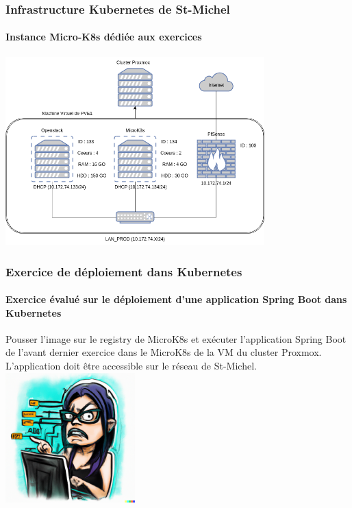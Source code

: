 \documentclass{beamer}
\begin{document}
    \begin{frame}
        \transdissolve
        \frametitle{Infrastructure Kubernetes de St-Michel}
        \framesubtitle{Instance Micro-K8s dédiée aux exercices}
        \bigbreak
        \centering
        \includegraphics[width=10cm]{image/infra.drawio}
    \end{frame}

    \begin{frame}
        \transdissolve
        \frametitle{Exercice de déploiement dans Kubernetes}
        \framesubtitle{Exercice évalué sur le déploiement d'une application Spring Boot dans Kubernetes}
        Pousser l'image sur le registry de MicroK8s et exécuter l'application Spring Boot  de l'avant dernier exercice dans le MicroK8s de la VM du cluster Proxmox.
        \bigbreak
        L'application doit être accessible sur le réseau de St-Michel.
        \bigbreak
        \centering
        \includegraphics[width=5cm]{image/maniac-programmer-sorting-her-code}
    \end{frame}
\end{document}
